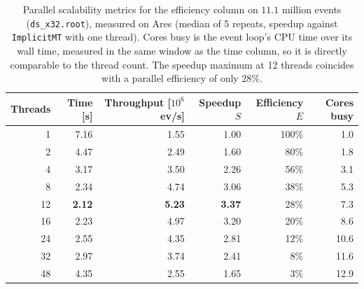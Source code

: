 \begin{table}[htbp]
\centering
\caption{Parallel scalability metrics for the efficiency column on $11.1$ million events (\texttt{ds\_x32.root}), measured on Ares (median of 5 repeats, speedup against \texttt{ImplicitMT} with one thread). Cores busy is the event loop's CPU time over its wall time, measured in the same window as the time column, so it is directly comparable to the thread count. The speedup maximum at 12 threads coincides with a parallel efficiency of only $28\%$.}
\label{tab:scalability-efficiency}
\begin{tabular}{rrrrrr}
\toprule
Threads & Time [s] & Throughput [$10^6$ ev/s] & Speedup $S$ & Efficiency $E$ & Cores busy \\
\midrule
 1 & 7.16 & 1.55 & 1.00 & 100\% & 1.0 \\
 2 & 4.47 & 2.49 & 1.60 & 80\% & 1.8 \\
 4 & 3.17 & 3.50 & 2.26 & 56\% & 3.1 \\
 8 & 2.34 & 4.74 & 3.06 & 38\% & 5.3 \\
12 & \textbf{2.12} & \textbf{5.23} & \textbf{3.37} & 28\% & 7.3 \\
16 & 2.23 & 4.97 & 3.20 & 20\% & 8.6 \\
24 & 2.55 & 4.35 & 2.81 & 12\% & 10.6 \\
32 & 2.97 & 3.74 & 2.41 & 8\% & 11.6 \\
48 & 4.35 & 2.55 & 1.65 & 3\% & 12.9 \\
\bottomrule
\end{tabular}
\end{table}
